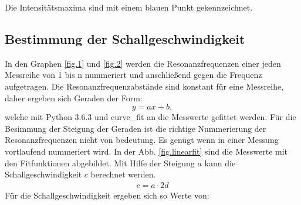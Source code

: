 Die Intensitätsmaxima sind mit einem blauen Punkt gekennzeichnet.
\FloatBarrier

\subsection{Bestimmung der Schallgeschwindigkeit}
\FloatBarrier
In den Graphen \ref{fig.1} und \ref{fig.2} %
werden die Resonanzfrequenzen einer jeden Messreihe von 1 bis n nummeriert und anschließend gegen die Frequenz aufgetragen.
Die Resonanzfrequenzabstände sind konstant für eine Messreihe, daher ergeben sich Geraden der Form:
\begin{equation*}
  y=ax+b,
\end{equation*}
welche mit Python 3.6.3 und curve\_fit an die Messwerte gefittet werden.
Für die Besimmung der Steigung der Geraden ist die richtige Nummerierung der Resonanzfrequenzen nicht von bedeutung.
Es genügt wenn in einer Messung vortlaufend nummeriert wird.
In der Abb. \ref{fig.linearfit} sind die Messwerte mit den Fitfunktionen abgebildet.
Mit Hilfe der Steigung $a$ kann die Schallgeschwindigkeit $c$ berechnet werden.
\begin{align*}
  c = a\cdot2d
\end{align*}
Für die Schallgeschwindigkeit ergeben sich so Werte von:
